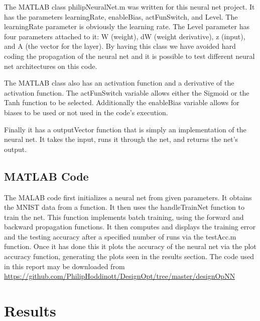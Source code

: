 \documentclass[12pt]{article}
\begin{document}
	
	The MATLAB class philipNeuralNet.m was written for this neural net project. It has the parameters learningRate, enableBias, actFunSwitch, and Level. The learningRate parameter is obviously the learning rate. The Level parameter has four parameters attached to it: W (weight), dW (weight derivative),  z (input), and A (the vector for the layer). By having this class we have avoided hard coding the propagation of the neural net and it is possible to test different neural net architectures on this code. \par 
	
	The MATLAB class also has an activation function and a derivative of the activation function. The actFunSwitch variable allows either the Sigmoid or the Tanh function to be selected. Additionally the enableBias variable allows for biases to be used or not used in the code's execution. \par 
	Finally it has a outputVector function that is simply an implementation of the neural net. It takes the input, runs it through the net, and returns the net's output. \par 
	
	
	
	\subsection{MATLAB Code}
	The MALAB code first initializes a neural net from given parameters. It obtains the MNIST data from a function\cite{usingMNIST}. It then uses the handleTrainNet function to train the net. This function implements batch training, using the forward and backward propagation functions. It then computes and displays the training error and the testing accuracy after a specified number of runs via the testAcc.m function. Once it has done this it plots the accuracy of the neural net via the plot accuracy function, generating the plots seen in the results section. The code used in this report may be downloaded from \url{https://github.com/PhilipHoddinott/DesignOpt/tree/master/designOpNN}\par 
	
	
	 
	
	
	\section{Results}
\end{document}
